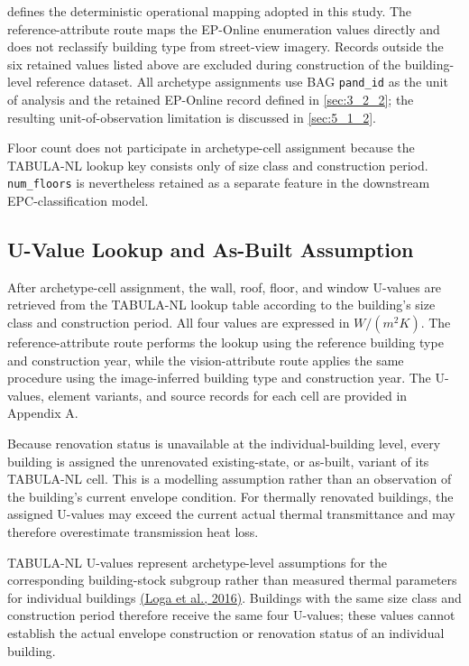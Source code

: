  defines the deterministic operational mapping adopted in this study. The reference-attribute route maps the EP-Online enumeration values directly and does not reclassify building type from street-view imagery. Records outside the six retained values listed above are excluded during construction of the building-level reference dataset. All archetype assignments use BAG \texttt{pand\_id} as the unit of analysis and the retained EP-Online record defined in \cref{sec:3_2_2}; the resulting unit-of-observation limitation is discussed in \cref{sec:5_1_2}.


Floor count does not participate in archetype-cell assignment because the TABULA-NL lookup key consists only of size class and construction period. \texttt{num\_floors} is nevertheless retained as a separate feature in the downstream EPC-classification model.


\subsection{U-Value Lookup and As-Built Assumption}
\label{sec:3_4_3}


After archetype-cell assignment, the wall, roof, floor, and window U-values are retrieved from the TABULA-NL lookup table according to the building's size class and construction period. All four values are expressed in \(W/(m^2K)\). The reference-attribute route performs the lookup using the reference building type and construction year, while the vision-attribute route applies the same procedure using the image-inferred building type and construction year. The U-values, element variants, and source records for each cell are provided in Appendix A.


Because renovation status is unavailable at the individual-building level, every building is assigned the unrenovated existing-state, or as-built, variant of its TABULA-NL cell. This is a modelling assumption rather than an observation of the building's current envelope condition. For thermally renovated buildings, the assigned U-values may exceed the current actual thermal transmittance and may therefore overestimate transmission heat loss.


TABULA-NL U-values represent archetype-level assumptions for the corresponding building-stock subgroup rather than measured thermal parameters for individual buildings \hyperlink{ref:loga2016}{(Loga et al., 2016)}. Buildings with the same size class and construction period therefore receive the same four U-values; these values cannot establish the actual envelope construction or renovation status of an individual building.



